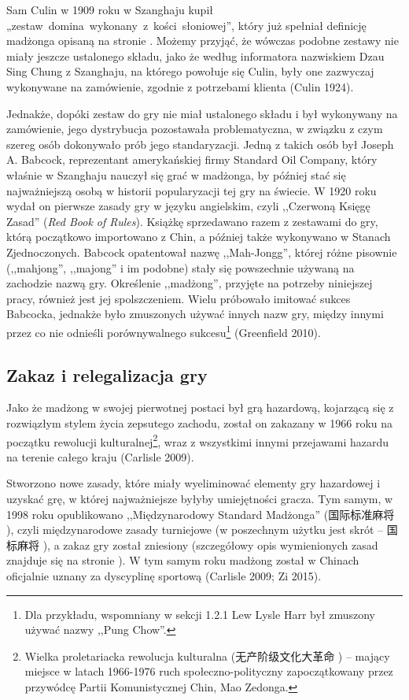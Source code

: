 Sam Culin w 1909 roku w Szanghaju kupił \mbox{„zestaw
domina wykonany z kości słoniowej”,} który już spełniał definicję madżonga
opisaną na stronie \pageref{definicja}. Możemy przyjąć, że wówczas podobne
zestawy nie miały jeszcze ustalonego składu, jako że według informatora nazwiskiem Dzau Sing
Chung z Szanghaju, na którego powołuje się Culin, były one
zazwyczaj wykonywane na zamówienie, zgodnie z potrzebami klienta (Culin 1924).

Jednakże, dopóki zestaw do gry nie miał ustalonego składu i był wykonywany na
zamówienie, jego dystrybucja pozostawała problematyczna, w związku z czym szereg
osób dokonywało prób jego standaryzacji. Jedną z takich osób był Joseph A.
Babcock, reprezentant amerykańskiej firmy Standard Oil Company, który właśnie w
Szanghaju nauczył się grać w madżonga, by później
stać się najważniejszą osobą w historii popularyzacji tej gry na świecie. W
1920 roku wydał on pierwsze zasady gry w języku
angielskim, czyli ,,Czerwoną Księgę Zasad'' (\textit{Red Book of Rules}).
Książkę sprzedawano razem z zestawami do gry, którą początkowo importowano z
Chin, a później także wykonywano w Stanach Zjednoczonych. Babcock opatentował
nazwę ,,Mah-Jongg'', której różne pisownie (,,mahjong'', ,,majong'' i im
podobne) stały się powszechnie używaną na zachodzie nazwą gry. Określenie
,,madżong'', przyjęte na potrzeby niniejszej pracy, również jest jej
spolszczeniem. Wielu próbowało imitować sukces Babcocka, jednakże było
zmuszonych używać innych nazw gry, między innymi przez co nie odnieśli
porównywalnego sukcesu\footnote{Dla przykładu, wspomniany w sekcji 1.2.1 Lew
Lysle Harr był zmuszony używać nazwy ,,Pung Chow''.} (Greenfield 2010).

\subsection{Zakaz i relegalizacja gry}
\label{zakaz_1966}
Jako że madżong w swojej pierwotnej postaci był grą hazardową, kojarzącą się z
rozwiązłym stylem życia zepsutego zachodu, został on zakazany w 1966 roku na
początku rewolucji kulturalnej\footnote{Wielka proletariacka rewolucja
kulturalna (无产阶级文化大革命   ) --
mający miejsce w latach 1966-1976 ruch społeczno-polityczny zapoczątkowany przez
przywódcę Partii Komunistycznej Chin, Mao Zedonga.}, wraz z wszystkimi innymi
przejawami hazardu na terenie całego kraju (Carlisle 2009).

\label{relegalizacja}
Stworzono nowe zasady, które miały wyeliminować elementy gry hazardowej i
uzyskać grę, w której najważniejsze byłyby umiejętności gracza. Tym samym, w
1998 roku opublikowano ,,Międzynarodowy Standard Madżonga'' (国际标准麻将
), czyli międzynarodowe zasady turniejowe (w
poszechnym użytku jest skrót -- 国标麻将  ), a zakaz
gry został zniesiony (szczegółowy opis wymienionych zasad znajduje się na stronie
\pageref{guobiao}).
W tym samym roku madżong został w Chinach oficjalnie uznany za dyscyplinę sportową (Carlisle 2009; Zi 2015).

